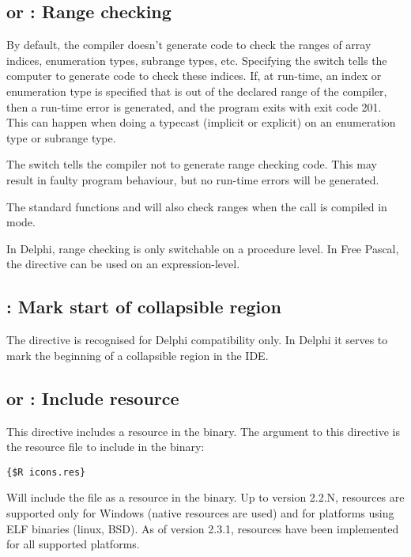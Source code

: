 \subsection{ or  : Range checking}

By default, the compiler doesn't generate code to check the ranges of array
indices, enumeration types, subrange types, etc. Specifying the
 switch tells the computer to generate code to check these
indices. If, at run-time, an index or enumeration type is specified that is
out of the declared range of the compiler, then a run-time error is
generated, and the program exits with exit code 201. This can happen when
doing a typecast (implicit or explicit) on an enumeration type or subrange
type.

The  switch tells the compiler not to generate range checking
code. This may result in faulty program behaviour, but no run-time errors
will be generated.

\begin{remark}The standard functions  and  will also check ranges
when the call is compiled in  mode.
\end{remark}

In Delphi, range checking is only switchable on a procedure level. In Free
Pascal, the  directive can be used on an expression-level.

\subsection{ : Mark start of collapsible region}
The  directive is recognised for Delphi compatibility only.
In Delphi it serves to mark the beginning of a collapsible region in the
IDE.

\subsection{ or  : Include resource}
This directive includes a resource in the binary. The argument to this directive is the resource
file to include in the binary:
\begin{verbatim}
{$R icons.res}
\end{verbatim}
Will include the file  as a resource in the binary. Up to
version 2.2.N, resources are supported only for Windows (native resources are used) 
and for platforms using ELF binaries (linux, BSD). As of version 2.3.1,
resources have been implemented for all supported platforms.


